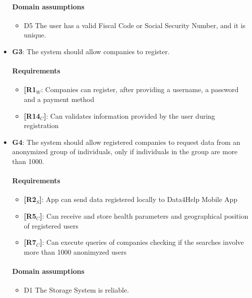\begin{itemize}
   \paragraph{Domain assumptions}
   \begin{itemize}
    \item  D5  The user has a valid Fiscal Code or Social Security Number, and it is unique.
   \end{itemize}
   
    \item \textbf{G3}: The system should allow companies to register.
    \paragraph{Requirements}
   \begin{itemize}
    \item \textbf{[R1$_W$}: Companies can register, after providing a username, a password and a payment method
    \item \textbf{[R14$_C$]}: Can validates information provided by the user during registration
   \end{itemize}
    \item \textbf{G4}: The system should allow registered companies to request data from an anonymized group of individuals, only if individuals in the group are more than 1000.
    \paragraph{Requirements}
   \begin{itemize}
    \item \textbf{[R2$_S$]}: App can send data registered locally to Data4Help Mobile App
    \item \textbf{[R5$_C$]}: Can receive and store health parameters and geographical position of registered users
    \item \textbf{[R7$_C$]}: Can execute queries of companies checking if the searches involve more than 1000 anonimyzed users
   \end{itemize}
   \paragraph{Domain assumptions}
   \begin{itemize}
    \item  D1  The Storage System is reliable.
   \end{itemize}
   

\end{itemize}
